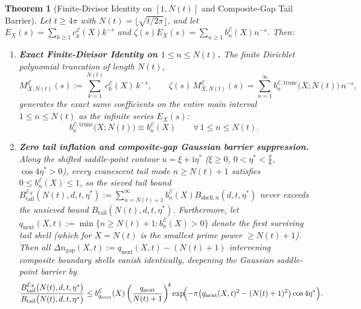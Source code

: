 \documentclass[11pt,reqno]{amsart}
\newtheorem{theorem}{Theorem}[section]
\theoremstyle{definition}
\theoremstyle{remark}
\numberwithin{equation}{section}
\newcommand{\ii}{\mathrm{i}}
\begin{document}
\begin{theorem}[{Finite-Divisor Identity on $[1, N(t)]$ and Composite-Gap Tail Barrier}]\label{thm:finite_divisor_tail}
Let $t \ge 4\pi$ with $N(t) = \lfloor\sqrt{t/2\pi}\rfloor$, and let $E_X(s) =\allowbreak \sum_{k \ge 1} c_k^{\mathcal{E}}(X)k^{-s}$ and $\zeta(s)E_X(s) =\allowbreak \sum_{n \ge 1} b_n^{\mathcal{E}}(X)n^{-s}$. Then:
\begin{enumerate}[label=\textup{(\alph*)},leftmargin=2.2em]
\item \textbf{Exact Finite-Divisor Identity on $1 \le n \le N(t)$.} The finite Dirichlet polynomial truncation of length $N(t)$,
\begin{equation}\label{eq:MX_Nt_trunc}
M_{X,N(t)}^{\mathcal{E}}(s) := \sum_{k=1}^{N(t)} c_k^{\mathcal{E}}(X)\,k^{-s}, \qquad \zeta(s)\,M_{X,N(t)}^{\mathcal{E}}(s) = \sum_{n=1}^{\infty} b_n^{\mathcal{E},\mathrm{trunc}}\bigl(X; N(t)\bigr)\,n^{-s},
\end{equation}
generates the exact same coefficients on the entire main interval $1 \le n \le N(t)$ as the infinite series $E_X(s)$:
\begin{equation}\label{eq:exact_main_sum_identity}
b_n^{\mathcal{E},\mathrm{trunc}}\bigl(X; N(t)\bigr) \equiv b_n^{\mathcal{E}}(X) \qquad \forall\, 1 \le n \le N(t).
\end{equation}
\item \textbf{Zero tail inflation and composite-gap Gaussian barrier suppression.} Along the shifted saddle-point contour $u = \xi + \ii\eta^*$ ($\xi \ge 0$, $0 < \eta^* < \frac{\pi}{8}$, $\cos 4\eta^* > 0$), every evanescent tail mode $n \ge N(t) + 1$ satisfies $0 \le b_n^{\mathcal{E}}(X) \le 1$, so the sieved tail bound $B_{\mathrm{tail}}^{\mathcal{E}_X}(N(t),d,t,\eta^*) := \sum_{n=N(t)+1}^{\infty} b_n^{\mathcal{E}}(X)B_{\mathrm{shell},n}(d,t,\eta^*)$ never exceeds the unsieved bound $B_{\mathrm{tail}}(N(t),d,t,\eta^*)$. Furthermore, let $q_{\mathrm{next}}(X,t) := \min\{n \ge N(t)+1 : b_n^{\mathcal{E}}(X) > 0\}$ denote the first surviving tail shell (which for $X = N(t)$ is the smallest prime power $\ge N(t)+1$). Then all $\Delta n_{\mathrm{gap}}(X,t) := q_{\mathrm{next}}(X,t) - (N(t)+1)$ intervening composite boundary shells vanish identically, deepening the Gaussian saddle-point barrier by
\begin{equation}\label{eq:composite_gap_barrier}
\frac{B_{\mathrm{tail}}^{\mathcal{E}_X}\bigl(N(t),d,t,\eta^*\bigr)}{B_{\mathrm{tail}}\bigl(N(t),d,t,\eta^*\bigr)} \le b_{q_{\mathrm{next}}}^{\mathcal{E}}(X)\left(\frac{q_{\mathrm{next}}}{N(t)+1}\right)^{\!4}\exp\!\Bigl(-\pi\bigl(q_{\mathrm{next}}(X,t)^2 - (N(t)+1)^2\bigr)\cos 4\eta^*\Bigr).
\end{equation}
\end{enumerate}
\end{theorem}
\end{document}
